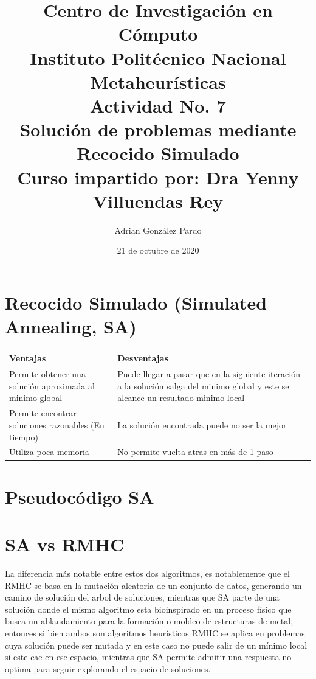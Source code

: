 \documentclass[10pt]{article}
\title{Centro de Investigación en Cómputo\\Instituto Politécnico Nacional\\Metaheurísticas\\Actividad No. 7\\ Solución de problemas mediante Recocido Simulado\\Curso impartido por: Dra Yenny Villuendas Rey}
\author{Adrian González Pardo}
\date{21 de octubre de 2020}
\begin{document}
\maketitle
\section{Recocido Simulado (Simulated Annealing, SA)}
\begin{center}
  \begin{tabular}{|p{6cm}|p{6cm}|}
    \hline
    Ventajas & Desventajas \\
    \hline
    Permite obtener una solución aproximada al minimo global & Puede llegar a pasar que en la siguiente iteración a la solución salga del minimo global y este se alcance un resultado minimo local \\
    \hline
    Permite encontrar soluciones razonables (En tiempo) & La solución encontrada puede no ser la mejor\\
    \hline
    Utiliza poca memoria & No permite vuelta atras en más de 1 paso\\
    \hline
  \end{tabular}
\end{center}
\section{Pseudocódigo SA}

\section{SA vs RMHC}
La diferencia más notable entre estos dos algoritmos, es notablemente que el RMHC se basa en la mutación aleatoria de un conjunto de datos, generando un camino de solución del arbol de soluciones, mientras que SA parte de una solución donde el mismo algoritmo esta bioinspirado en un proceso físico que busca un ablandamiento para la formación o moldeo de estructuras de metal, entonces si bien ambos son algoritmos heurísticos RMHC se aplica en problemas cuya solución puede ser mutada y en este caso no puede salir de un mínimo local si este cae en ese espacio, mientras que SA permite admitir una respuesta no optima para seguir explorando el espacio de soluciones.
\end{document}
